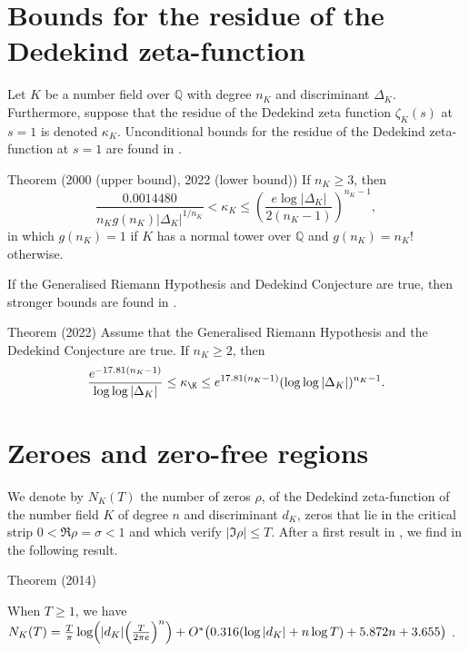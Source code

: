 \section{Bounds for the residue of the Dedekind zeta-function}

Let $K$ be a number field over $\mathbb{Q}$ with degree $n_K$ and discriminant $\Delta_K$. Furthermore, suppose that the residue of the Dedekind zeta
function $\zeta_K(s)$ at $s=1$ is denoted $\kappa_K$. Unconditional bounds for the residue of the Dedekind zeta-function at $s=1$ are found in \cite{Louboutin*00} \cite{Garcia-Lee*22}.

\par 
\begin{thm}{Theorem (2000 (upper bound), 2022 (lower bound))}
If $n_K\geq 3$, then
$$
    \frac{0.0014480}{n_K g(n_K){|\Delta_K|}^{1/n_K}}
    < \kappa_K \leq
    \left(\frac{e\log |\Delta_K| }{2(n_K - 1)}\right)^{n_K - 1},
$$
in which $g(n_K)=1$ if $K$ has a normal tower over $\mathbb{Q}$ and $g(n_K) = n_K!$ otherwise. 
\end{thm}

If the Generalised Riemann Hypothesis and Dedekind Conjecture are true, then stronger bounds are found in \cite{Garcia-Lee*22a}.

\begin{thm}{Theorem (2022)}
Assume that the Generalised Riemann Hypothesis and the Dedekind Conjecture are true. If $n_K\geq 2$, then
$$
    \frac{e^{-17.81(n_K -1)}}{\log\log{|\Delta_K|}} \leq \kappa_{\K} \leq e^{17.81(n_K -1 )} (\log\log{|\Delta_K|})^{n_K-1} .
$$
\end{thm}

\section{Zeroes and zero-free regions }


We denote by $N_K(T)$ the number of zeros $\rho$, of the Dedekind
zeta-function of the number field $K$ of degree $n$ and discriminant
$d_K$,
zeros that lie in the critical strip
$0 < \Re \rho = \sigma < 1$ and which verify $|\Im \rho|\le T$.
After a first result in
\cite{Kadiri-Ng*12},
we find in
\cite{Trudgian*14-1}
the following result.

\par 
\begin{thm}{Theorem (2014)}

 When $T\ge1$, we have
 $N_K(T)=\frac{T}{\pi}\log\Bigl(|d_K|\Big(\frac{T}{2\pi e}\Bigr)^n\Bigr)
 +O^*\bigl(0.316(\log |d_K|+n\log T)+5.872 n+3.655\bigr)$ .
\end{thm}



